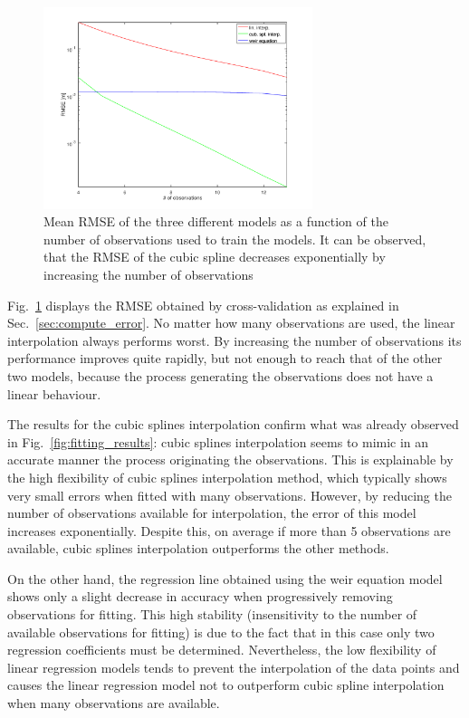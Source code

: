 \begin{figure}[h]
  \centering
  \includegraphics[width=0.7\textwidth]{Figures/fitting_errors.png}
  \caption{Mean RMSE of the three different models as a function of the number of observations used to train the models. It can be observed, that the RMSE of the cubic spline decreases exponentially by increasing the number of observations}
  \label{fig:fitting_errors}
\end{figure}

Fig.~\ref{fig:fitting_errors} displays the RMSE obtained by cross-validation as explained in Sec.~\ref{sec:compute_error}.
No matter how many observations are used, the linear interpolation always performs worst.
By increasing the number of observations its performance improves quite rapidly, but not enough to reach that of the other two models, because the process generating the observations does not have a linear behaviour.
 
The results for the cubic splines interpolation confirm what was already observed in Fig.~\ref{fig:fitting_results}:  cubic splines interpolation seems to mimic in an accurate manner the process originating the observations.  This is explainable by the high flexibility of cubic splines interpolation method, which typically shows very small errors when fitted with many observations. However, by reducing the number of observations available for interpolation, the error of this model increases exponentially. Despite this, on average if more than 5 observations are available, cubic splines interpolation outperforms the other methods.

On the other hand, the regression line obtained using the weir equation model shows only a slight decrease in accuracy when progressively removing observations for fitting. This high stability (insensitivity to the number of available observations for fitting) is due to the fact that in this case only two regression coefficients must be determined. Nevertheless, the low flexibility of linear regression models tends to prevent the interpolation of the data points and causes the linear regression model not to outperform cubic spline interpolation when many observations are available.

